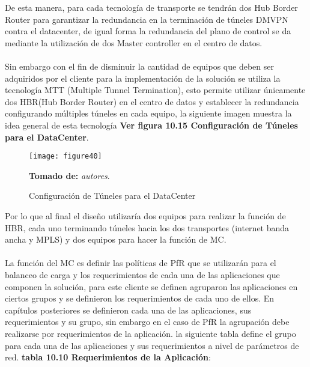 De esta manera, para cada tecnología de transporte se tendrán dos Hub Border Router para garantizar la redundancia en la terminación de túneles DMVPN contra el datacenter, de igual forma la redundancia del plano de control se da mediante la utilización de dos Master controller en el centro de datos.
\\
\\
Sin embargo con el fin de disminuir la cantidad de equipos que deben ser adquiridos por el cliente para la implementación de la solución se utiliza la tecnología MTT (Multiple Tunnel Termination), esto permite utilizar únicamente dos HBR(Hub Border Router) en el centro de datos y establecer la redundancia configurando múltiples túneles en cada equipo, la siguiente imagen muestra la idea general de esta tecnología \textbf{Ver figura 10.15 Configuración de Túneles para el DataCenter}.

\begin{figure}[htbp]
  \centering
    {\texttt{[image: figure40]}}%
  \caption{\footnotesize{Configuración de Túneles para el DataCenter}}
   \footnotesize{\textbf{Tomado de:} \textit{autores}.}
  \label{fig:fig2subfig}
\end{figure}

Por lo que al final el diseño utilizaría dos equipos para realizar la función de HBR, cada uno terminando túneles hacia los dos transportes (internet banda ancha y MPLS) y dos equipos para hacer la función de MC.
\\
\\
La función del MC es definir las políticas de PfR que se utilizarán para el balanceo de carga y los requerimientos de cada una de las aplicaciones que componen la solución, para este cliente se definen agruparon las aplicaciones en ciertos grupos y se definieron los requerimientos de cada uno de ellos. En capítulos posteriores se definieron cada una de las aplicaciones, sus requerimientos y su grupo, sin embargo en el caso de PfR la agrupación debe realizarse por requerimientos de la aplicación. la siguiente tabla define el grupo para cada una de las aplicaciones y sus requerimientos a nivel de parámetros de red.
\textbf{tabla 10.10 Requerimientos de la Aplicación}:

